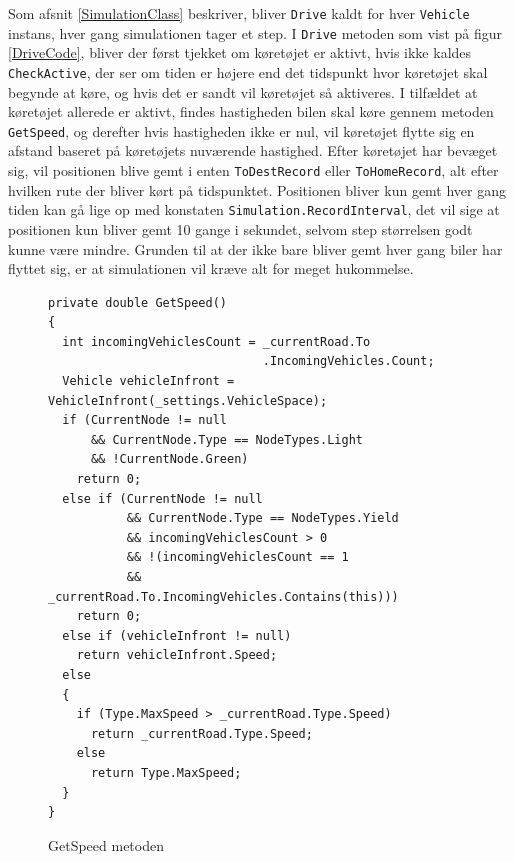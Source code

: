 Som afsnit \ref{SimulationClass} beskriver, bliver \texttt{Drive} kaldt for hver \texttt{Vehicle} instans, hver gang simulationen tager et step. I \texttt{Drive} metoden som vist på figur \ref{DriveCode}, bliver der først tjekket om køretøjet er aktivt, hvis ikke kaldes \texttt{CheckActive}, der ser om tiden er højere end det tidspunkt hvor køretøjet skal begynde at køre, og hvis det er sandt vil køretøjet så aktiveres. I tilfældet at køretøjet allerede er aktivt, findes hastigheden bilen skal køre gennem metoden \texttt{GetSpeed}, og derefter hvis hastigheden ikke er nul, vil køretøjet flytte sig en afstand baseret på køretøjets nuværende hastighed. Efter køretøjet har bevæget sig, vil positionen blive gemt i enten \texttt{ToDestRecord} eller \texttt{ToHomeRecord}, alt efter hvilken rute der bliver kørt på tidspunktet. Positionen bliver kun gemt hver gang tiden kan gå lige op med konstaten \texttt{Simulation.RecordInterval}, det vil sige at positionen kun bliver gemt 10 gange i sekundet, selvom step størrelsen godt kunne være mindre. Grunden til at der ikke bare bliver gemt hver gang biler har flyttet sig, er at simulationen vil kræve alt for meget hukommelse.

\begin{figure}[H]
\begin{lstlisting}
private double GetSpeed()
{
  int incomingVehiclesCount = _currentRoad.To
                              .IncomingVehicles.Count;
  Vehicle vehicleInfront = VehicleInfront(_settings.VehicleSpace);
  if (CurrentNode != null 
      && CurrentNode.Type == NodeTypes.Light 
      && !CurrentNode.Green)
    return 0;
  else if (CurrentNode != null 
           && CurrentNode.Type == NodeTypes.Yield
           && incomingVehiclesCount > 0 
           && !(incomingVehiclesCount == 1 
           && _currentRoad.To.IncomingVehicles.Contains(this)))
    return 0;
  else if (vehicleInfront != null)
    return vehicleInfront.Speed;
  else
  {
    if (Type.MaxSpeed > _currentRoad.Type.Speed)
      return _currentRoad.Type.Speed;
    else
      return Type.MaxSpeed;
  }
}
\end{lstlisting}
\caption{GetSpeed metoden}\label{GetSpeedCode}
\end{figure}

